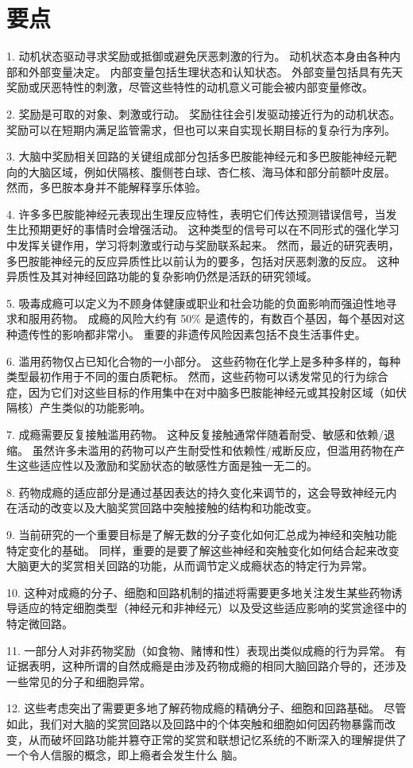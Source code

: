 \section{要点}

1. 动机状态驱动寻求奖励或抵御或避免厌恶刺激的行为。
动机状态本身由各种内部和外部变量决定。
内部变量包括生理状态和认知状态。
外部变量包括具有先天奖励或厌恶特性的刺激，尽管这些特性的动机意义可能会被内部变量修改。


2. 奖励是可取的对象、刺激或行动。
奖励往往会引发驱动接近行为的动机状态。
奖励可以在短期内满足监管需求，但也可以来自实现长期目标的复杂行为序列。


3. 大脑中奖励相关回路的关键组成部分包括多巴胺能神经元和多巴胺能神经元靶向的大脑区域，例如伏隔核、腹侧苍白球、杏仁核、海马体和部分前额叶皮层。
然而，多巴胺本身并不能解释享乐体验。 


4. 许多多巴胺能神经元表现出生理反应特性，表明它们传达预测错误信号，当发生比预期更好的事情时会增强活动。
这种类型的信号可以在不同形式的强化学习中发挥关键作用，学习将刺激或行动与奖励联系起来。
然而，最近的研究表明，多巴胺能神经元的反应异质性比以前认为的要多，包括对厌恶刺激的反应。
这种异质性及其对神经回路功能的复杂影响仍然是活跃的研究领域。


5. 吸毒成瘾可以定义为不顾身体健康或职业和社会功能的负面影响而强迫性地寻求和服用药物。
成瘾的风险大约有 50\% 是遗传的，有数百个基因，每个基因对这种遗传性的影响都非常小。
重要的非遗传风险因素包括不良生活事件史。


6. 滥用药物仅占已知化合物的一小部分。
这些药物在化学上是多种多样的，每种类型最初作用于不同的蛋白质靶标。
然而，这些药物可以诱发常见的行为综合症，因为它们对这些目标的作用集中在对中脑多巴胺能神经元或其投射区域（如伏隔核）产生类似的功能影响。


7. 成瘾需要反复接触滥用药物。
这种反复接触通常伴随着耐受、敏感和依赖/退缩。
虽然许多未滥用的药物可以产生耐受性和依赖性/戒断反应，但滥用药物在产生这些适应性以及激励和奖励状态的敏感性方面是独一无二的。


8. 药物成瘾的适应部分是通过基因表达的持久变化来调节的，这会导致神经元内在活动的改变以及大脑奖赏回路中突触接触的结构和功能改变。


9. 当前研究的一个重要目标是了解无数的分子变化如何汇总成为神经和突触功能特定变化的基础。
同样，重要的是要了解这些神经和突触变化如何结合起来改变大脑更大的奖赏相关回路的功能，从而调节定义成瘾状态的特定行为异常。


10. 这种对成瘾的分子、细胞和回路机制的描述将需要更多地关注发生某些药物诱导适应的特定细胞类型（神经元和非神经元）以及受这些适应影响的奖赏途径中的特定微回路。


11. 一部分人对非药物奖励（如食物、赌博和性）表现出类似成瘾的行为异常。
有证据表明，这种所谓的自然成瘾是由涉及药物成瘾的相同大脑回路介导的，还涉及一些常见的分子和细胞异常。 


12. 这些考虑突出了需要更多地了解药物成瘾的精确分子、细胞和回路基础。
尽管如此，我们对大脑的奖赏回路以及回路中的个体突触和细胞如何因药物暴露而改变，从而破坏回路功能并篡夺正常的奖赏和联想记忆系统的不断深入的理解提供了一个令人信服的概念，即上瘾者会发生什么 脑。


